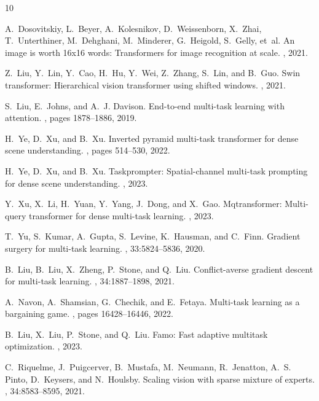 \documentclass[10pt,journal,compsoc]{IEEEtran}
\begin{document}

\begin{thebibliography}{10}

A.~Dosovitskiy, L.~Beyer, A.~Kolesnikov, D.~Weissenborn, X.~Zhai, T.~Unterthiner, M.~Dehghani, M.~Minderer, G.~Heigold, S.~Gelly, et~al.
\newblock An image is worth 16x16 words: Transformers for image recognition at scale.
, 2021.

Z.~Liu, Y.~Lin, Y.~Cao, H.~Hu, Y.~Wei, Z.~Zhang, S.~Lin, and B.~Guo.
\newblock Swin transformer: Hierarchical vision transformer using shifted windows.
, 2021.

S.~Liu, E.~Johns, and A.~J. Davison.
\newblock End-to-end multi-task learning with attention.
, pages 1878--1886, 2019.

H.~Ye, D.~Xu, and B.~Xu.
\newblock Inverted pyramid multi-task transformer for dense scene understanding.
, pages 514--530, 2022.

H.~Ye, D.~Xu, and B.~Xu.
\newblock Taskprompter: Spatial-channel multi-task prompting for dense scene understanding.
, 2023.

Y.~Xu, X.~Li, H.~Yuan, Y.~Yang, J.~Dong, and X.~Gao.
\newblock Mqtransformer: Multi-query transformer for dense multi-task learning.
, 2023.

T.~Yu, S.~Kumar, A.~Gupta, S.~Levine, K.~Hausman, and C.~Finn.
\newblock Gradient surgery for multi-task learning.
, 33:5824--5836, 2020.

B.~Liu, B.~Liu, X.~Zheng, P.~Stone, and Q.~Liu.
\newblock Conflict-averse gradient descent for multi-task learning.
, 34:1887--1898, 2021.

A.~Navon, A.~Shamsian, G.~Chechik, and E.~Fetaya.
\newblock Multi-task learning as a bargaining game.
, pages 16428--16446, 2022.

B.~Liu, X.~Liu, P.~Stone, and Q.~Liu.
\newblock Famo: Fast adaptive multitask optimization.
, 2023.

C.~Riquelme, J.~Puigcerver, B.~Mustafa, M.~Neumann, R.~Jenatton, A.~S. Pinto, D.~Keysers, and N.~Houlsby.
\newblock Scaling vision with sparse mixture of experts.
, 34:8583--8595, 2021.


\end{thebibliography}
\end{document}
